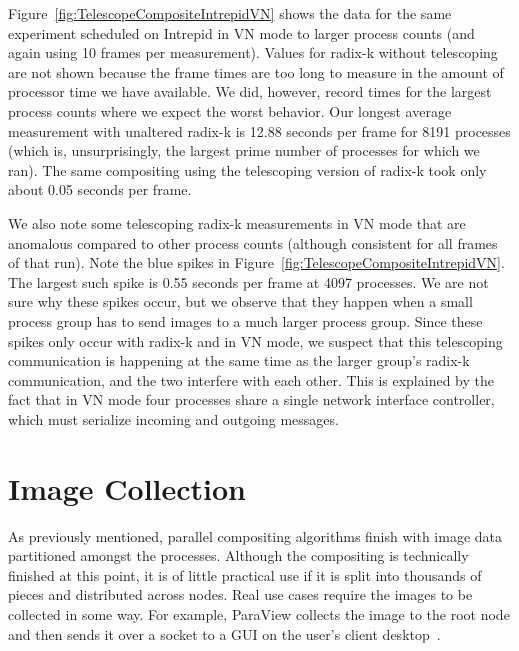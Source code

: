 \documentclass{acm_proc_article-sp}
\newcommand*{\lcite}[1]{~\cite{#1}}
\begin{document}
Figure~\ref{fig:TelescopeCompositeIntrepidVN} shows the data for the same
experiment scheduled on Intrepid in VN mode to larger process counts (and
again using 10 frames per measurement).  Values for radix-k without
telescoping are not shown because the frame times are too long to measure
in the amount of processor time we have available.  We did, however, record
times for the largest process counts where we expect the worst behavior.
Our longest average measurement with unaltered radix-k is 12.88 seconds per
frame for 8191 processes (which is, unsurprisingly, the largest prime
number of processes for which we ran).  The same compositing using the
telescoping version of radix-k took only about 0.05 seconds per frame.

We also note some telescoping radix-k measurements in VN mode that are
anomalous compared to other process counts (although consistent for all
frames of that run).  Note the blue spikes in
Figure~\ref{fig:TelescopeCompositeIntrepidVN}.  The largest such spike is
0.55 seconds per frame at 4097 processes.  We are not sure why these spikes
occur, but we observe that they happen when a small process group has to
send images to a much larger process group.  Since these spikes only occur
with radix-k and in VN mode, we suspect that this telescoping communication
is happening at the same time as the larger group's radix-k communication,
and the two interfere with each other.  This is explained by the fact that
in VN mode four processes share a single network interface controller,
which must serialize incoming and outgoing messages.

\section{Image Collection}
\label{sec:ImageCollection}

As previously mentioned, parallel compositing algorithms finish with image
data partitioned amongst the processes.  Although the compositing is
technically finished at this point, it is of little practical use if it is
split into thousands of pieces and distributed across nodes.  Real use
cases require the images to be collected in some way.  For example,
ParaView collects the image to the root node and then sends it over a
socket to a GUI on the user's client desktop\lcite{Cedilnik2006}.
\end{document}
